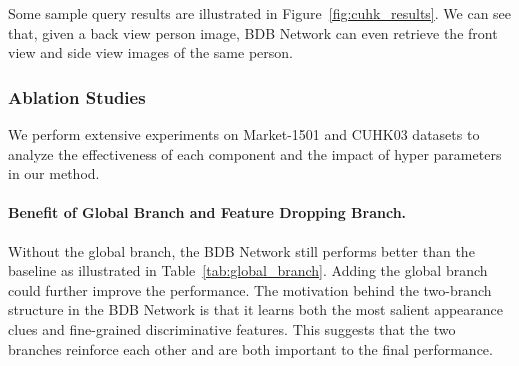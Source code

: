 \documentclass[10pt,twocolumn,letterpaper]{article}
\begin{document}
Some sample query results are illustrated in Figure~\ref{fig:cuhk_results}. We can see that, given a back view person image, BDB Network can even retrieve the front view and side view images of the same person.
\vspace{-3mm}
\subsubsection{Ablation Studies}
We perform extensive experiments on Market-1501 and CUHK03 datasets to analyze the effectiveness of each component and the impact of hyper parameters in our method.

\begin{table}[]
    \begin{center}
    \end{center}
    \vspace{-4mm}
    \caption{The effect of global branch and feature dropping branch on Market-1501 dataset. `Cut' means Cutout~\cite{devries2017improved} augmentation.}
    \label{tab:global_branch}
    \vspace{1mm}
\end{table}



\paragraph{Benefit of Global Branch and Feature Dropping Branch.}\vspace{-4mm}
Without the global branch, the BDB Network still performs better than the baseline as illustrated in Table~\ref{tab:global_branch}. Adding the global branch could further improve the performance. The motivation behind the two-branch structure in the BDB Network is that it learns both the most salient appearance clues and fine-grained discriminative features. This suggests that the two branches reinforce each other and are both important to the final performance.
\end{document}
